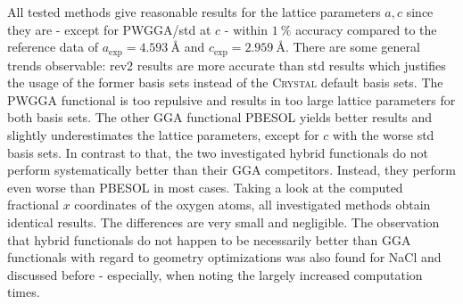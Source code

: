 \documentclass[a4paper,12pt]{scrartcl}
\begin{document}
All tested methods give reasonable results for the lattice parameters $ a, c $ since they are - except for PWGGA/std at $ c $ - within $ \SI{1}{\percent} $ accuracy compared to the reference data of $ a_\mathrm{exp} = \SI{4.593}{\angstrom} $ and $ c_\mathrm{exp} = \SI{2.959}{\angstrom} $. There are some general trends observable: rev2 results are more accurate than std results which justifies the usage of the former basis sets instead of the \textsc{Crystal} default basis sets. The PWGGA functional is too repulsive and results in too large lattice parameters for both basis sets. The other GGA functional PBESOL yields better results and slightly underestimates the lattice parameters, except for $ c $ with the worse std basis sets. In contrast to that, the two investigated hybrid functionals do not perform systematically better than their GGA competitors. Instead, they perform even worse than PBESOL in most cases. Taking a look at the computed fractional $ x $ coordinates of the oxygen atoms, all investigated methods obtain identical results. The differences are very small and negligible. The observation that hybrid functionals do not happen to be necessarily better than GGA functionals with regard to geometry optimizations was also found for NaCl and discussed before - especially, when noting the largely increased computation times. 
%
\end{document}
